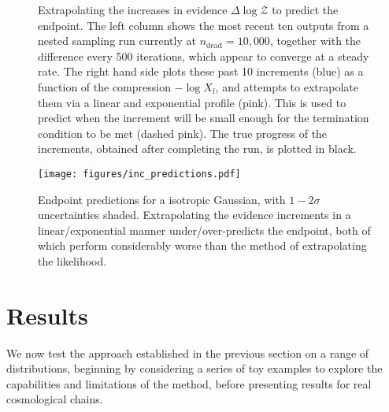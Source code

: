 \documentclass[usenatbib]{mnras}
\begin{document}
\begin{figure}
\begin{adjustbox}{valign=t, scale=0.7}
\end{adjustbox}
\quad
\begin{adjustbox}{valign=t, scale=0.9}
\end{adjustbox}
\caption{Extrapolating the increases in evidence $\Delta \log \mathcal{Z}$ to predict the endpoint. The left column shows the most recent ten outputs from a nested sampling run currently at $n_\mathrm{dead} = 10,000$, together with the difference every 500 iterations, which appear to converge at a steady rate. The right hand side plots these past 10 increments (blue) as a function of the compression $-\log X_\mathrm{f}$, and attempts to extrapolate them via a linear and exponential profile (pink). This is used to predict when the increment will be small enough for the termination condition to be met (dashed pink). The true progress of the increments, obtained after completing the run, is plotted in black.}
\label{fig:inc_extrapolate}
\end{figure}
\begin{figure}
\texttt{[image: figures/inc\_predictions.pdf]}
\caption{Endpoint predictions for a isotropic Gaussian, with $1-2\sigma$ uncertainties shaded. Extrapolating the evidence increments in a linear/exponential manner under/over-predicts the endpoint, both of which perform considerably worse than the method of extrapolating the likelihood.}
\label{fig:inc_predictions}
\end{figure}

\section{Results}\label{sec:results}
We now test the approach established in the previous section on a range of distributions, beginning by considering a series of toy examples to explore the capabilities and limitations of the method, before presenting results for real cosmological chains.
\end{document}
